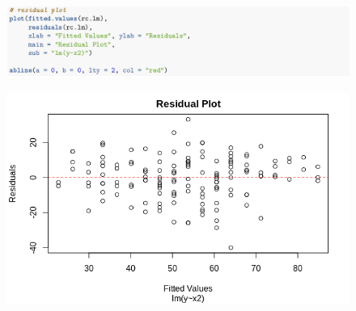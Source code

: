 \begin{figure}[H]
	\centering
	\includegraphics[width=\linewidth]{./images/s7fig7.png}
\end{figure}
\begin{figure}[H]
	\centering
	\includegraphics[width=12cm]{./images/s7fig3.png}
\end{figure}